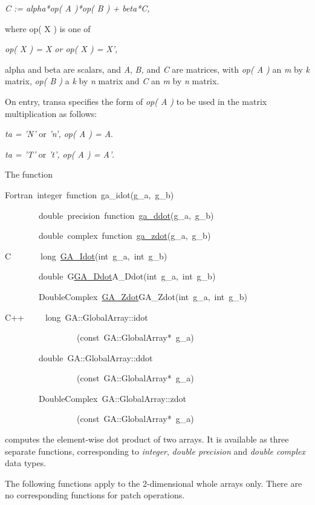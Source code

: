 \emph{C := alpha{*}op( A ){*}op( B ) + beta{*}C,}

where op( X ) is one of

\emph{op( X ) = X or op( X ) = X',}

alpha and beta are scalars, and \emph{A}, \emph{B,} and \emph{C} are
matrices, with \emph{op( A ) }an \emph{m} by \emph{k} matrix, \emph{op(
B )} a \emph{k} by \emph{n} matrix and \emph{C} an \emph{m} by \emph{n}
matrix.

On entry, transa specifies the form of \emph{op( A )} to be used in
the matrix multiplication as follows: 

\emph{ta = 'N'} or\emph{ 'n', op( A ) = A}. 

\emph{ta = 'T'} or \emph{'t', op( A ) = A'}.

The function
\begin{lyxcode}
Fortran~integer~function~ga\_idot(g\_a,~g\_b)~

~~~~~~~~double~precision~function~\href{http://www.emsl.pnl.gov/docs/global/ga_ops.html\#ga_ddot}{ga\_{}ddot}(g\_a,~g\_b)

~~~~~~~~double~complex~function~\href{http://www.emsl.pnl.gov/docs/global/ga_ops.html\#ga_zdot}{ga\_{}zdot}(g\_a,~g\_b)~

C~~~~~~~long~\href{http://www.emsl.pnl.gov/docs/global/c_nga_ops.html\#ga_dot}{GA\_{}Idot}(int~g\_a,~int~g\_b)~

~~~~~~~~double~G\href{http://www.emsl.pnl.gov/docs/global/c_nga_ops.html\#ga_dot}{GA\_{}Ddot}A\_Ddot(int~g\_a,~int~g\_b)~

~~~~~~~~DoubleComplex~\href{http://www.emsl.pnl.gov/docs/global/c_nga_ops.html\#ga_dot}{GA\_{}Zdot}GA\_Zdot(int~g\_a,~int~g\_b)~

C++~~~~~long~GA::GlobalArray::idot

~~~~~~~~~~~~~~~~~(const~GA::GlobalArray{*}~g\_a)~

~~~~~~~~double~GA::GlobalArray::ddot

~~~~~~~~~~~~~~~~~(const~GA::GlobalArray{*}~g\_a)~

~~~~~~~~DoubleComplex~GA::GlobalArray::zdot

~~~~~~~~~~~~~~~~~(const~GA::GlobalArray{*}~g\_a)
\end{lyxcode}
computes the element-wise dot product of two arrays. It is available
as three separate functions, corresponding to \emph{integer}, \emph{double
precision} and \emph{double complex} data types.

The following functions apply to the 2-dimensional whole arrays only.
There are no corresponding functions for patch operations.

